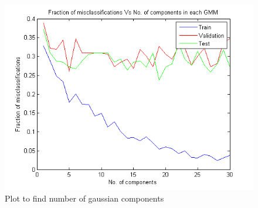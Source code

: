 \documentclass{article}
\begin{document}
\begin{figure}[H]
\centering
\includegraphics[width=\linewidth]{Classification/images/MisClassFraction.png}
\caption{Plot to find number of gaussian components}
\end{figure}
\end{document}
